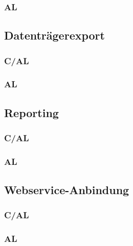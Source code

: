 \subsubsection{AL}

\subsection{Datenträgerexport}
\subsubsection{C/AL}
\subsubsection{AL}

\subsection{Reporting}
\subsubsection{C/AL}
\subsubsection{AL}

\subsection{Webservice-Anbindung}
\subsubsection{C/AL}
\subsubsection{AL}
















